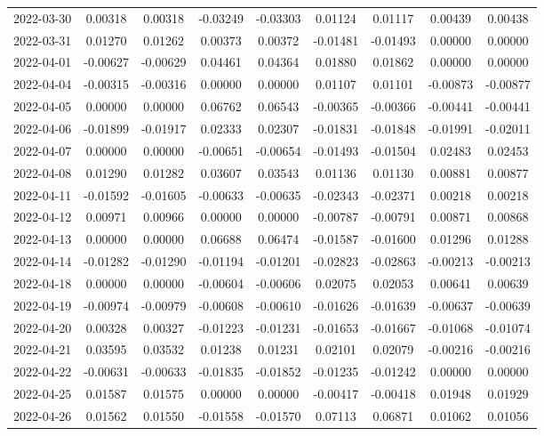 {\begin{footnotesize}
\begin{longtable}{lcccccccc}
2022-03-30 & 0.00318 & 0.00318 & -0.03249 & -0.03303 & 0.01124 & 0.01117 & 0.00439 & 0.00438 \\
2022-03-31 & 0.01270 & 0.01262 & 0.00373 & 0.00372 & -0.01481 & -0.01493 & 0.00000 & 0.00000 \\
2022-04-01 & -0.00627 & -0.00629 & 0.04461 & 0.04364 & 0.01880 & 0.01862 & 0.00000 & 0.00000 \\
2022-04-04 & -0.00315 & -0.00316 & 0.00000 & 0.00000 & 0.01107 & 0.01101 & -0.00873 & -0.00877 \\
2022-04-05 & 0.00000 & 0.00000 & 0.06762 & 0.06543 & -0.00365 & -0.00366 & -0.00441 & -0.00441 \\
2022-04-06 & -0.01899 & -0.01917 & 0.02333 & 0.02307 & -0.01831 & -0.01848 & -0.01991 & -0.02011 \\
2022-04-07 & 0.00000 & 0.00000 & -0.00651 & -0.00654 & -0.01493 & -0.01504 & 0.02483 & 0.02453 \\
2022-04-08 & 0.01290 & 0.01282 & 0.03607 & 0.03543 & 0.01136 & 0.01130 & 0.00881 & 0.00877 \\
2022-04-11 & -0.01592 & -0.01605 & -0.00633 & -0.00635 & -0.02343 & -0.02371 & 0.00218 & 0.00218 \\
2022-04-12 & 0.00971 & 0.00966 & 0.00000 & 0.00000 & -0.00787 & -0.00791 & 0.00871 & 0.00868 \\
2022-04-13 & 0.00000 & 0.00000 & 0.06688 & 0.06474 & -0.01587 & -0.01600 & 0.01296 & 0.01288 \\
2022-04-14 & -0.01282 & -0.01290 & -0.01194 & -0.01201 & -0.02823 & -0.02863 & -0.00213 & -0.00213 \\
2022-04-18 & 0.00000 & 0.00000 & -0.00604 & -0.00606 & 0.02075 & 0.02053 & 0.00641 & 0.00639 \\
2022-04-19 & -0.00974 & -0.00979 & -0.00608 & -0.00610 & -0.01626 & -0.01639 & -0.00637 & -0.00639 \\
2022-04-20 & 0.00328 & 0.00327 & -0.01223 & -0.01231 & -0.01653 & -0.01667 & -0.01068 & -0.01074 \\
2022-04-21 & 0.03595 & 0.03532 & 0.01238 & 0.01231 & 0.02101 & 0.02079 & -0.00216 & -0.00216 \\
2022-04-22 & -0.00631 & -0.00633 & -0.01835 & -0.01852 & -0.01235 & -0.01242 & 0.00000 & 0.00000 \\
2022-04-25 & 0.01587 & 0.01575 & 0.00000 & 0.00000 & -0.00417 & -0.00418 & 0.01948 & 0.01929 \\
2022-04-26 & 0.01562 & 0.01550 & -0.01558 & -0.01570 & 0.07113 & 0.06871 & 0.01062 & 0.01056 \\

\end{longtable}
\end{footnotesize}}
